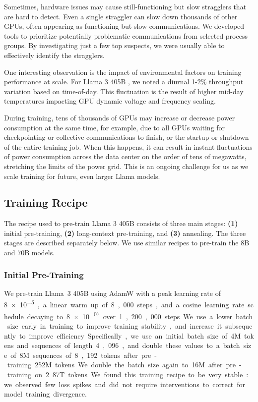Sometimes, hardware issues may cause still-functioning but slow stragglers that are hard to detect. Even a single straggler can slow down thousands of other GPUs, often appearing as functioning but slow communications. We developed tools to prioritize potentially problematic communications from selected process groups. By investigating just a few top suspects,  we were usually able to effectively identify the stragglers.

One interesting observation is the impact of environmental factors on training performance at scale. For Llama 3 405B , we noted a diurnal 1-2\% throughput variation based on time-of-day. This fluctuation is the result of higher mid-day temperatures impacting GPU dynamic voltage and frequency scaling.

During training, tens of thousands of GPUs may increase or decrease power consumption at the same time, for example, due to all GPUs waiting for checkpointing or collective communications to finish, or the startup or shutdown of the entire training job. When this happens, it can result in instant fluctuations of power consumption across the data center on the order of tens of megawatts, stretching the limits of the power grid. This is an ongoing challenge for us as we scale training for future, even larger Llama models.

\subsection{Training Recipe}
\label{section:pretraining_training_recipe}
The recipe used to pre-train Llama 3 405B consists of three main stages: \textbf{(1)} initial pre-training, \textbf{(2)} long-context pre-training, and \textbf{(3)} annealing. The three stages are described separately below. We use similar recipes to pre-train the 8B and 70B models.

\subsubsection{Initial Pre-Training} We pre-train Llama~3 405B using AdamW with a peak learning rate of \SI{8e-5}, a linear warm up of 8,000 steps, and a cosine learning rate schedule decaying to \SI{8e-07} over 1,200,000 steps. We use a lower batch size early in training to improve training stability, and increase it subsequently to improve efficiency. Specifically, we use an initial batch size of 4M tokens and sequences of length 4,096, and double these values to a batch size of 8M sequences of 8,192 tokens after pre-training 252M tokens. We double the batch size again to 16M after pre-training on 2.87T tokens. We found this training recipe to be very stable: we observed few loss spikes and did not require interventions to correct for model training divergence.

